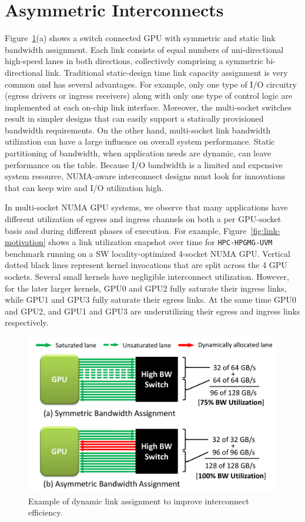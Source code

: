 \section{Asymmetric Interconnects}
\label{sec:interconnect}

Figure~\ref{fig:symmetric_assymetric}(a) shows a switch connected GPU
with symmetric and static link bandwidth assignment.
Each link consists of equal numbers of uni-directional high-speed
lanes in both directions, collectively comprising a symmetric bi-directional
link. Traditional static-design time link capacity assignment is very common and has
several advantages. For example, only one type of I/O circuitry
(egress drivers or ingress receivers) along with only one type of control logic
are implemented at each on-chip link interface. Moreover, the multi-socket
switches result in simpler designs that can easily support a statically provisioned
bandwidth requirements. On the other hand, multi-socket link bandwidth utilization can have
a large influence on overall system performance. Static partitioning of bandwidth,
when application needs are dynamic, can leave performance on the table.
Because I/O bandwidth is a limited and expensive system resource, NUMA-aware
interconnect designs must look for innovations that can keep wire and I/O
utilization high. 

In multi-socket NUMA GPU systems, we observe that many applications have 
different utilization of egress and ingress channels on both a per GPU-socket basis
and during different phases of execution. For example,
Figure~\ref{fig:link-motivation} shows a link utilization snapshot over time for
\texttt{HPC-HPGMG-UVM} benchmark running on a SW locality-optimized 4-socket NUMA GPU. 
Vertical dotted black lines represent
kernel invocations that are split across the 4 GPU sockets. Several small kernels have
negligible interconnect utilization. However, for the later
larger kernels, GPU0 and GPU2 fully saturate their ingress links,
while GPU1 and GPU3 fully saturate their egress links. At the same time GPU0 
and GPU2, and GPU1 and GPU3 are underutilizing their egress and ingress links respectively.

\begin{figure}[t]
    \centering
    \includegraphics[width=1.0\columnwidth]{figures/link_assignment.pdf}
    \caption{Example of dynamic link assignment to improve interconnect efficiency.}
    \label{fig:symmetric_assymetric}
\end{figure}

